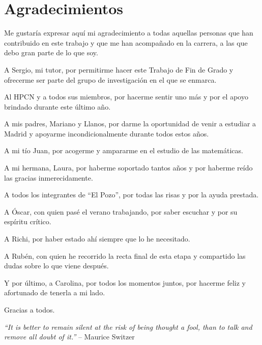 \chapter*{Agradecimientos}

Me gustaría expresar aquí mi agradecimiento a todas aquellas personas que han contribuido en este trabajo y que me han acompañado en la carrera, a las que debo gran parte de lo que soy.

\noindent
A Sergio, mi tutor, por permitirme hacer este Trabajo de Fin de Grado y ofrecerme ser parte del grupo de investigación en el que se enmarca.

\noindent
Al HPCN y a todos sus miembros, por hacerme sentir uno más y por el apoyo brindado durante este último año.

\noindent
A mis padres, Mariano y Llanos, por darme la oportunidad de venir a estudiar a Madrid y apoyarme incondicionalmente durante todos estos años.

\noindent
A mi tío Juan, por acogerme y ampararme en el estudio de las matemáticas.

\noindent
A mi hermana, Laura, por haberme soportado tantos años y por haberme reído las gracias inmerecidamente.

\noindent
A todos los integrantes de ``El Pozo'', por todas las risas y por la ayuda prestada.

\noindent
A Óscar, con quien pasé el verano trabajando, por saber escuchar y por su espíritu crítico.

\noindent
A Richi, por haber estado ahí siempre que lo he necesitado.

\noindent
A Rubén, con quien he recorrido la recta final de esta etapa y compartido las dudas sobre lo que viene después.

\noindent
Y por último, a Carolina, por todos los momentos juntos, por hacerme feliz y afortunado de tenerla a mi lado.

\noindent
Gracias a todos.

\begin{flushright}
\textit{``It is better to remain silent at the risk of being thought a fool, than to talk and remove all doubt of it.''}
-- Maurice Switzer
\end{flushright}
